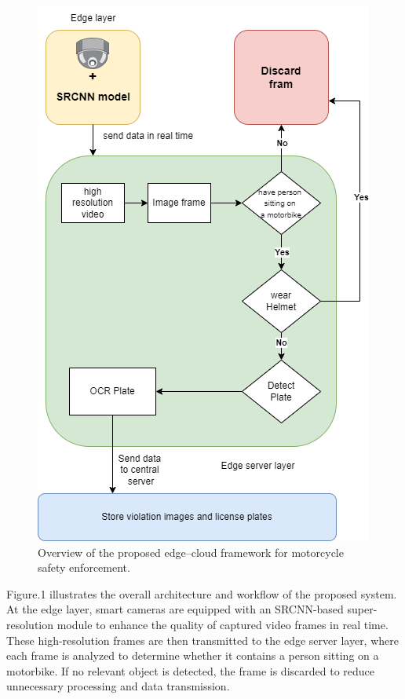 \documentclass[conference]{IEEEtran}
\begin{document}
\begin{figure}[!h]
    \centering
    \includegraphics[width=1\linewidth]{images/3layers.png}
    \caption{Overview of the proposed edge–cloud framework for motorcycle safety enforcement.}
    \label{fig:proposed model}
\end{figure}

Figure.1 illustrates the overall architecture and workflow of the proposed system. At the edge layer, smart cameras are equipped with an SRCNN-based super-resolution module to enhance the quality of captured video frames in real time. These high-resolution frames are then transmitted to the edge server layer, where each frame is analyzed to determine whether it contains a person sitting on a motorbike. If no relevant object is detected, the frame is discarded to reduce unnecessary processing and data transmission.
\end{document}
